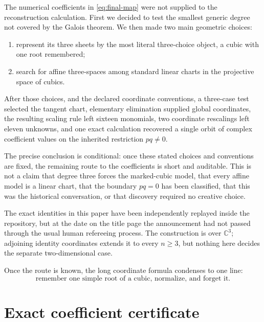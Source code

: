 \documentclass[11pt,a4paper]{article}
\numberwithin{equation}{section}
\theoremstyle{definition}
\theoremstyle{remark}
\newcommand{\C}{\mathbb C}
\begin{document}
The numerical coefficients in \eqref{eq:final-map} were not supplied to the
reconstruction calculation.  First we decided to test the smallest generic
degree not covered by the Galois theorem.  We then made two main geometric
choices:
\begin{enumerate}
\item represent its three sheets by the most literal three-choice object, a
  cubic with one root remembered;
\item search for affine three-spaces among standard linear charts in the
  projective space of cubics.
\end{enumerate}
After those choices, and the declared coordinate conventions, a three-case
test selected the tangent chart, elementary elimination supplied global
coordinates, the resulting scaling rule left sixteen monomials, two
coordinate rescalings left eleven unknowns, and one exact calculation
recovered a single orbit of complex coefficient values on the inherited
restriction \(pq\ne0\).

The precise conclusion is conditional: once these stated choices and
conventions are fixed, the remaining route to the coefficients is short and
auditable.  This is not a claim that degree three forces the marked-cubic
model, that every affine model is a linear chart, that the boundary \(pq=0\)
has been classified, that this was the historical conversation, or that
discovery required no creative choice.

The exact identities in this paper have been independently replayed inside
the repository, but at the date on the title page the announcement had not
passed through the usual human refereeing process.  The construction is over
\(\C^3\); adjoining identity coordinates extends it to every \(n\ge3\), but
nothing here decides the separate two-dimensional case.

Once the route is known, the long coordinate formula condenses to one line:
\[
  \boxed{\text{remember one simple root of a cubic, normalize, and forget it.}}
\]

\appendix

\section{Exact coefficient certificate}\label{app:certificate}
\end{document}
